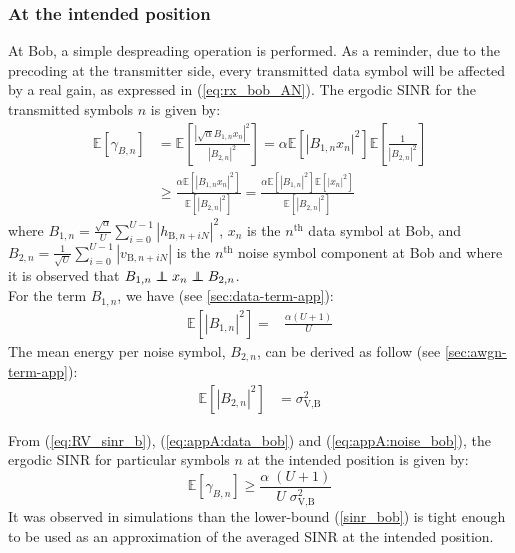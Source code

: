 \documentclass[journal,comsoc]{IEEEtran}
\newcommand{\EX}[1]{\mathbb{E} \left[#1\right]}%
\newcommand\independent{\protect\mathpalette{\protect\independenT}{\perp}}
\def\independenT#1#2{\mathrel{\rlap{$#1#2$}\mkern2mu{#1#2}}}
\begin{document}
\subsubsection{At the intended position}
At Bob, a simple despreading operation is performed. As a reminder, due to the precoding at the transmitter side, every transmitted data symbol will be affected by a real gain, as expressed in (\ref{eq:rx_bob_AN}). The ergodic SINR for the transmitted symbols $n$ is given by:
\begin{equation}
\begin{split}
\EX{\gamma_{B,n}} &= \EX{ \frac{  \left| \sqrt{\alpha} B_{1,n} x_n \right|^2  }{  \left| B_{2,n} \right|^2} }  = \alpha \EX{\left| B_{1,n}  x_n\right|^2}  \EX{\frac{1}{\left| B_{2,n} \right|^2}}  \\
& \geq  \frac{\alpha \EX{  \left| B_{1,n}  x_n\right|^2 } }{\EX{ \left| B_{2,n} \right|^2 }} =  \frac{\alpha \EX{ \left|B_{1,n}  \right|^2 } \EX{ \left| x_n \right|^2 } }{\EX{ \left| B_{2,n} \right|^2 }}
\label{eq:RV_sinr_b}
\end{split}
\end{equation}
where $B_{1,n} = \frac{\sqrt{\alpha}}{U}\sum_{i=0}^{U-1} \left| h_{\text{B}, n + iN}\right|^2$, $x_n$ is the $n^{\text{th}}$ data symbol at Bob, and $B_{2,n} = \frac{1}{\sqrt{U}}\sum_{i=0}^{U-1} \left| v_{\text{B}, n + iN}\right|$ is the $n^{\text{th}}$ noise symbol component at Bob and where it is observed that $B_{1,n} \independent x_n \independent B_{2,n}$.\\
For the term $B_{1,n}$, we have (see \ref{sec:data-term-app}):
\begin{equation}
	\begin{split}
	\EX{|B_{1,n}|^2} =& \frac{\alpha (U+1)}{U}
	\end{split}
	\label{eq:appA:data_bob}
\end{equation}
The mean energy per noise symbol, $B_{2,n}$, can be derived as follow (see \ref{sec:awgn-term-app}):
\begin{equation}
	\begin{split}
	\EX{|B_{2,n}|^2} &= \sigma^2_{\text{V,B}}
	\end{split}
	\label{eq:appA:noise_bob}
\end{equation}

From (\ref{eq:RV_sinr_b}), (\ref{eq:appA:data_bob}) and (\ref{eq:appA:noise_bob}), the ergodic SINR for particular symbols $n$ at the intended position is given by:
\begin{equation}
\EX{\gamma_{B,n}} \geq \frac{\alpha \;(U+1)}{U \; \sigma_{\text{V,B}}^2}
\label{sinr_bob}
\end{equation}
It was observed in simulations than the lower-bound (\ref{sinr_bob}) is tight enough to be used as an approximation of the averaged SINR at the intended position. 
\end{document}
